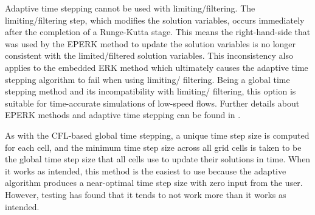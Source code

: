 


\NOTE Adaptive time stepping cannot be used with limiting\slash filtering.
%
The limiting\slash filtering step, which modifies the solution variables, occurs
immediately after the completion of a Runge-Kutta stage.
%
This means the right-hand-side that was used by the EPERK method to update the
solution variables is no longer consistent with the limited\slash filtered
solution variables.
%
This inconsistency also applies to the embedded ERK method which ultimately
causes the adaptive time stepping algorithm to fail when using limiting\slash
filtering.
%
Being a global time stepping method and its incompatibility with limiting\slash
filtering, this option is suitable for time-accurate simulations of low-speed
flows.
%
Further details about EPERK methods and adaptive time stepping can be found in
.


As with the CFL-based global time stepping, a unique time step size is computed
for each cell, and the minimum time step size across all grid cells is taken to
be the global time step size that all cells use to update their solutions in
time.
%
When it works as intended, this method is the easiest to use because the
adaptive algorithm produces a near-optimal time step size with zero input from
the user.
%
However, testing has found that it tends to not work more than it works as
intended.


